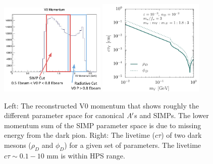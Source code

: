 \begin{figure}
    \centering
    \includegraphics[width=0.45\textwidth]{figs/upgrades/simp_p.png}
    \includegraphics[width=0.45\textwidth]{figs/upgrades/simp_lt.png}
    \caption{Left: The reconstructed V0 momentum that shows roughly the different parameter space for canonical $A^\prime$s and SIMPs. The lower momentum sum of the SIMP parameter space is due to missing energy from the dark pion. Right: The livetime ($c\tau$) of two dark mesons ($\rho_D$ and $\phi_D$) for a given set of parameters. The livetime $c\tau \sim 0.1 - 10$ mm is within HPS range.}
    \label{fig:simplivetime}
\end{figure}

